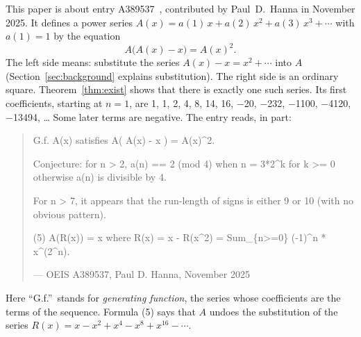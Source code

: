 \documentclass[11pt,a4paper]{article}
\theoremstyle{definition}
\theoremstyle{remark}
\begin{document}
This paper is about entry A389537~\cite{oeis}, contributed by Paul~D.~Hanna in November 2025. It defines a power
series $A(x)=a(1)\,x+a(2)\,x^2+a(3)\,x^3+\cdots$ with $a(1)=1$ by the equation
\begin{equation}\label{eq:oeis}
A\bigl(A(x)-x\bigr)=A(x)^2 .
\end{equation}
The left side means: substitute the series $A(x)-x=x^2+\cdots$ into $A$ (Section~\ref{sec:background} explains
substitution). The right side is an ordinary square. Theorem~\ref{thm:exist} shows that there is exactly one such series.
Its first coefficients, starting at $n=1$, are 1, 1, 2, 4, 8, 14, 16, $-$20, $-$232, $-$1100, $-$4120, $-$13494, \dots{} Some later terms
are negative. The entry reads, in part:
\begin{quote}\small\ttfamily\raggedright G.f. A(x) satisfies A( A(x) - x ) = A(x)\^{}2.\par\smallskip Conjecture: for n > 2, a(n) == 2 (mod 4) when n = 3*2\^{}k for k >= 0 otherwise a(n) is divisible by 4.\par\smallskip For n > 7, it appears that the run-length of signs is either 9 or 10 (with no obvious pattern).\par\smallskip (5) A(R(x)) = x where R(x) = x - R(x\^{}2) = Sum\_\{n>=0\} (-1)\^{}n * x\^{}(2\^{}n).\par\smallskip\hfill\textrm{--- OEIS A389537, Paul D. Hanna, November 2025}\end{quote}

Here ``G.f.''\ stands for \emph{generating function}, the series whose coefficients are the terms of the sequence.
Formula (5) says that $A$ undoes the substitution of the series $R(x)=x-x^2+x^4-x^8+x^{16}-\cdots$.
\end{document}

